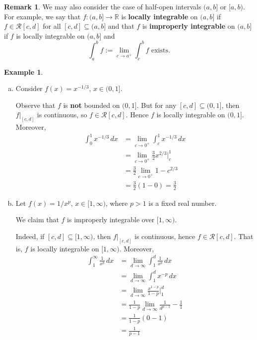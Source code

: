 \documentclass[11pt]{article}
\theoremstyle{definition}
\newtheorem{exmp}[thm]{Example}
\newtheorem{remark}[thm]{Remark}
\newcommand{\mbR}{\ensuremath{\mathbb{R}}}
\begin{document}
\begin{remark}
We may also consider the case of half-open intervals $(a, b]$ or $[a, b)$. 
For example, we say that $f : (a, b] \to \mbR$ is \textbf{locally integrable} on $(a, b]$ if $f \in \mathcal{R}[c, d]$ for all $[c, d] \subseteq (a, b]$ and that $f$ is \textbf{improperly integrable} on $(a, b]$ if $f$ is locally integrable on $(a, b]$ and
$$\int_a^b f := \lim_{c\to a^+} \int_c^b f \text{ exists.}$$
\end{remark}

\begin{exmp}~
\begin{enumerate}[(a)] \vspace{-0.2cm}
\item Consider $f(x) = x^{-1/3}$, $x \in (0, 1]$. 

Observe that $f$ is \textbf{not} bounded on $(0, 1]$. But for any $[c, d] \subseteq (0, 1]$, then $f|_{[c, d]}$ is continuous, so $f \in \mathcal{R}[c, d]$. Hence $f$ is locally integrable on $(0, 1]$. Moreover,
\begin{align*}
\int_0^1 x^{-1/3}\,dx 
& = \lim_{c\to0^+} \int_c^1 x^{-1/3}\,dx \\
& = \lim_{c\to0^+} \frac32x^{2/3}\biggr|_c^1 \\
& = \frac32 \lim_{c\to0^+} 1 - c^{2/3} \\
& = \frac32(1-0) = \frac32
\end{align*}
\item Let $f(x) = 1/x^p$, $x \in [1, \infty)$, where $p > 1$ is a fixed real number. 

We claim that $f$ is improperly integrable over $[1, \infty)$. 

Indeed, if $[c, d] \subseteq [1, \infty)$, then $f|_{[c, d]}$ is continuous, hence $f \in \mathcal{R}[c, d]$. That is, $f$ is locally integrable on $[1, \infty)$. Moreover,
\begin{align*}
\int_1^{\infty} \frac{1}{x^p}\,dx 
& = \lim_{d\to\infty} \int_1^d \frac{1}{x^p}\,dx \\
& = \lim_{d\to\infty} \int_1^d x^{-p}\,dx \\
& = \lim_{d\to\infty} \frac{x^{1-p}}{1-p} \biggr|_1^d \\
& = \frac{1}{1-p} \lim_{d\to\infty} \frac{1}{d^{p-1}} - \frac11 \\
& = \frac{1}{1-p}(0 - 1) \\
& = \frac{1}{p-1}
\end{align*}
\end{enumerate}
\end{exmp}
\end{document}
